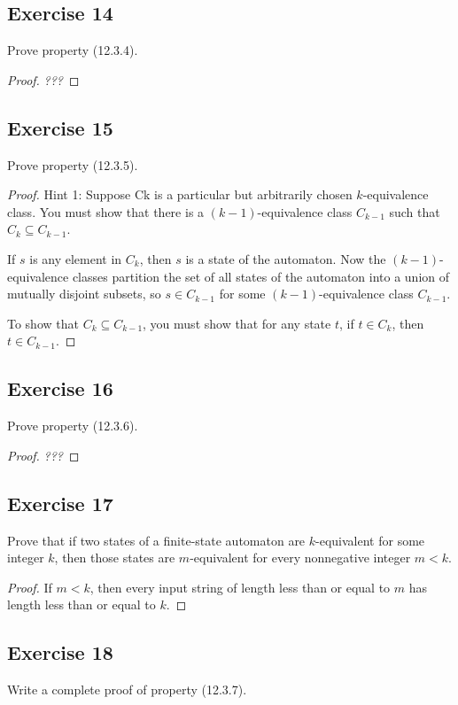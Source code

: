 \documentclass[14pt]{extarticle}
\begin{document}
\subsection{Exercise 14}
Prove property (12.3.4).
\begin{proof}
{\it ???}
\end{proof}

\subsection{Exercise 15}
Prove property (12.3.5).
\begin{proof}
Hint 1: Suppose Ck is a particular but arbitrarily chosen \(k\)-equivalence class. You must show that there is a 
\((k - 1)\)-equivalence class \(C_{k-1}\) such that \(C_k \subseteq C_{k-1}\).

If \(s\) is any element in \(C_k\), then \(s\) is a state of the automaton. Now the \((k - 1)\)-equivalence classes 
partition the set of all states of the automaton into a union of mutually disjoint subsets, so \(s \in C_{k-1}\) for some 
\((k - 1)\)-equivalence class \(C_{k-1}\).

To show that \(C_k \subseteq C_{k-1}\), you must show that for any state \(t\), if \(t \in C_k\), then \(t \in C_{k-1}\).
\end{proof}

\subsection{Exercise 16}
Prove property (12.3.6).
\begin{proof}
{\it ???}
\end{proof}

\subsection{Exercise 17}
Prove that if two states of a finite-state automaton are \(k\)-equivalent for some integer \(k\), then those states are 
\(m\)-equivalent for every nonnegative integer \(m < k\).

\begin{proof}
If \(m < k\), then every input string of length less than or equal to \(m\) has length less than or equal to \(k\).
\end{proof}

\subsection{Exercise 18}
Write a complete proof of property (12.3.7).
\end{document}
